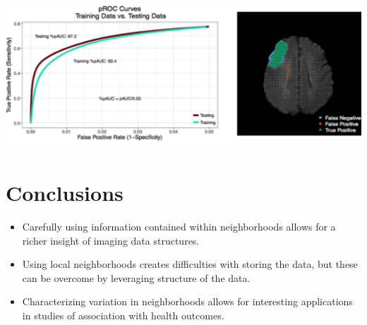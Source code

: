 \documentclass[a0,landscape]{a0poster}
\begin{document}
\begin{multicols}{3}
\begin{center}\vspace{.5cm}
\includegraphics[width=1\linewidth]{bothplots.pdf}
\end{center}\vspace{.5cm}

\large{\section*{\color{uwred}Conclusions}}
\begin{itemize}
\item  Carefully using information contained within neighborhoods allows for a richer insight of imaging data structures.
\item Using local neighborhoods creates difficulties with storing the data, but these can be overcome by leveraging structure of the data.
\item Characterizing variation in neighborhoods allows for interesting applications in studies of association with health outcomes. 
\end{itemize}
\end{multicols}
\end{document}
